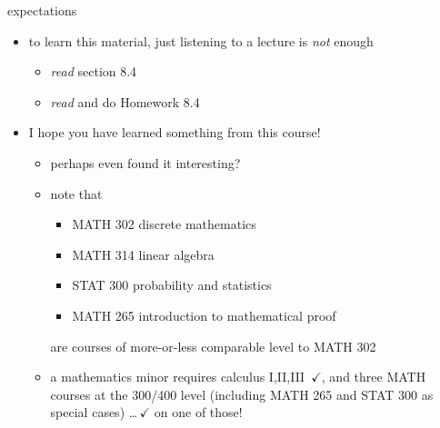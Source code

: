 \documentclass[dvipsnames,colorlinks]{beamer}
\begin{document}
\begin{frame}{expectations}

\begin{itemize}
\item to learn this material, just listening to a lecture is \emph{not} enough
     \begin{itemize}
     \item \emph{read} section 8.4
     \item \emph{read} and do Homework 8.4
     \end{itemize}

\item I hope you have learned something from this course!
     \begin{itemize}
     \item perhaps even found it interesting?
     \item note that
         \begin{itemize}
         \item MATH 302 discrete mathematics
         \item MATH 314 linear algebra
         \item STAT 300 probability and statistics
         \item MATH 265 introduction to mathematical proof
         \end{itemize}
         are courses of more-or-less comparable level to MATH 302
     \item a mathematics minor requires calculus I,II,III \,\alert{$\checkmark$}, and three MATH courses at the 300/400 level (including MATH 265 and STAT 300 as special cases) \dots \,\alert{$\checkmark$ on one of those!}
     \end{itemize}
\end{itemize}
\end{frame}
\end{document}
